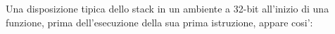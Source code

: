 
Una disposizione tipica dello stack in un ambiente a 32-bit all'inizio di una funzione, 
prima dell'esecuzione della sua prima istruzione, appare cosi':




